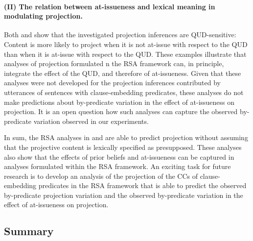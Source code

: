 \documentclass[11pt,fleqn]{article}
\newcommand{\6}{\mbox{$[\hspace*{-.6mm}[$}}
\newcommand{\9}{\mbox{$]\hspace*{-.6mm}]$}}
\begin{document}
\paragraph{(II) The relation between at-issueness and lexical meaning in modulating projection.} Both \citealt{qing-etal2016} and \citealt{warstadt2022} show that the investigated projection inferences are QUD-sensitive: Content is more likely to project when it is not at-issue with respect to the QUD than when it is at-issue with respect to the QUD. These examples illustrate that analyses of projection formulated n the RSA framework can, in principle, integrate the effect of the QUD, and therefore of at-issueness. Given that these analyses were not developed for the projection inferences contributed by utterances of sentences with clause-embedding predicates, these analyses do not make predictions about by-predicate variation in the effect of at-issueness on projection. It is an open question how such analyses can capture the observed by-predicate variation observed in our experiments. 

\bigskip

In sum, the RSA analyses in \citealt{qing-etal2016} and \citealt{warstadt2022} are able to predict projection without assuming that the projective content is lexically specified as presupposed. These analyses also show that the effects of prior beliefs and at-issueness can be captured in analyses formulated within the RSA framework. An exciting task for future research is to develop an analysis of the projection of the CCs of clause-embedding predicates in the RSA framework that is able to predict the observed by-predicate projection variation and the observed by-predicate variation in the effect of at-issueness on projection.


\subsection{Summary}
\end{document}

